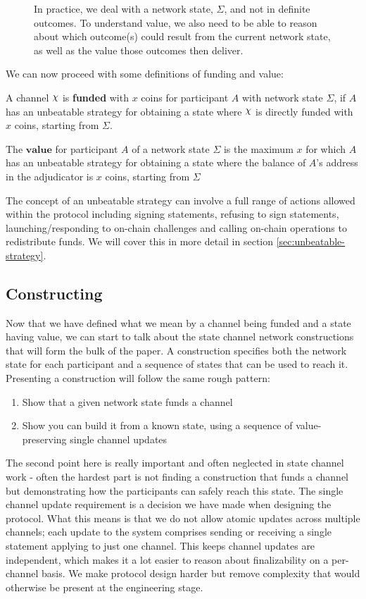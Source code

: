 \begin{figure}[h]\centering
  \makebox[\textwidth][c]{}
  \caption{
    In practice, we deal with a network state, $\Sigma$, and not in definite outcomes.
    To understand value, we also need to be able to reason about which outcome(s) could result from the current network state, as well as the value those outcomes then deliver.
  }\label{fig:system-state-direct-funding}
\end{figure}

We can now proceed with some definitions of funding and value:

A channel $\rchi$ is \textbf{funded} with $x$ coins for participant $A$ with network state $\Sigma$, if $A$ has an unbeatable strategy for obtaining a state where $\rchi$ is directly funded with $x$ coins, starting from $\Sigma$.

The $\textbf{value}$ for participant $A$ of a network state $\Sigma$ is the maximum $x$ for which $A$ has an unbeatable strategy for obtaining a state where the balance of $A$'s address in the adjudicator is $x$ coins, starting from $\Sigma$

The concept of an unbeatable strategy can involve a full range of actions allowed within the protocol including signing statements, refusing to sign statements, launching/responding to on-chain challenges and calling on-chain operations to redistribute funds.
We will cover this in more detail in section \ref{sec:unbeatable-strategy}.

\subsection{Constructing}

Now that we have defined what we mean by a channel being funded and a state having value, we can start to talk about the state channel network constructions that will form the bulk of the paper.
A construction specifies both the network state for each participant and a sequence of states that can be used to reach it.
Presenting a construction will follow the same rough pattern:
\begin{enumerate}
  \item Show that a given network state funds a channel
  \item Show you can build it from a known state, using a sequence of value-preserving single channel updates
\end{enumerate}
The second point here is really important and often neglected in state channel work - often the hardest part is not finding a construction that funds a channel but demonstrating how the participants can safely reach this state.
The single channel update requirement is a decision we have made when designing the protocol.
What this means is that we do not allow atomic updates across multiple channels;
each update to the system comprises sending or receiving a single statement applying to just one channel.
This keeps channel updates are independent, which makes it a lot easier to reason about finalizability on a per-channel basis.
We make protocol design harder but remove complexity that would otherwise be present at the engineering stage.

